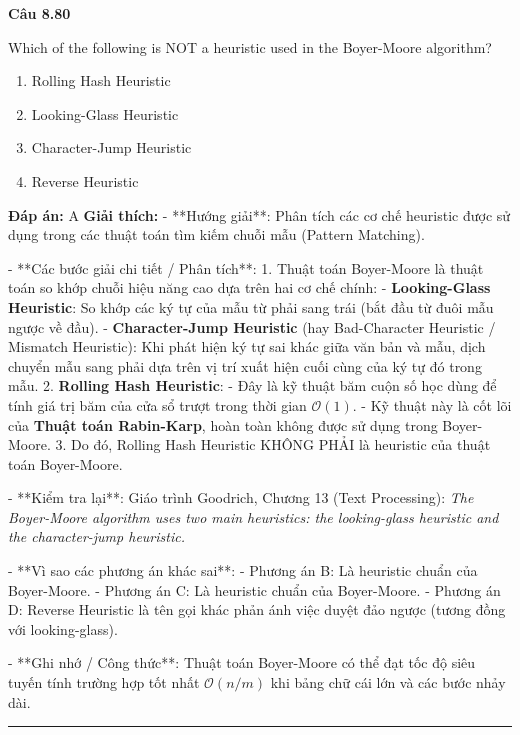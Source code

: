 \documentclass[11pt,a4paper]{article}
\newenvironment{question}[1]{%
  \par\vspace{1em}\noindent\textbf{\large Câu #1}\par\vspace{0.4em}
}{%
  \par\vspace{1em}\hrule\vspace{0.6em}
}
\newenvironment{choices}{%
  \begin{enumerate}[label=\textbf{\Alph*.},leftmargin=2.2em,itemsep=2pt,topsep=3pt]
}{%
  \end{enumerate}
}
\newcommand{\choice}{\item}
\begin{document}
\begin{question}{8.80}
Which of the following is NOT a heuristic used in the Boyer-Moore algorithm?
\begin{choices}
\choice Rolling Hash Heuristic
\choice Looking-Glass Heuristic
\choice Character-Jump Heuristic
\choice Reverse Heuristic
\end{choices}
\textbf{Đáp án:} A
\textbf{Giải thích:} - **Hướng giải**:
Phân tích các cơ chế heuristic được sử dụng trong các thuật toán tìm kiếm chuỗi mẫu (Pattern Matching).


- **Các bước giải chi tiết / Phân tích**:
1. Thuật toán Boyer-Moore là thuật toán so khớp chuỗi hiệu năng cao dựa trên hai cơ chế chính:
   - \textbf{Looking-Glass Heuristic}: So khớp các ký tự của mẫu từ phải sang trái (bắt đầu từ đuôi mẫu ngược về đầu).
   - \textbf{Character-Jump Heuristic} (hay Bad-Character Heuristic / Mismatch Heuristic): Khi phát hiện ký tự sai khác giữa văn bản và mẫu, dịch chuyển mẫu sang phải dựa trên vị trí xuất hiện cuối cùng của ký tự đó trong mẫu.
2. \textbf{Rolling Hash Heuristic}:
   - Đây là kỹ thuật băm cuộn số học dùng để tính giá trị băm của cửa sổ trượt trong thời gian \(\mathcal{O}(1)\).
   - Kỹ thuật này là cốt lõi của \textbf{Thuật toán Rabin-Karp}, hoàn toàn không được sử dụng trong Boyer-Moore.
3. Do đó, Rolling Hash Heuristic KHÔNG PHẢI là heuristic của thuật toán Boyer-Moore.


- **Kiểm tra lại**:
Giáo trình Goodrich, Chương 13 (Text Processing): \textit{The Boyer-Moore algorithm uses two main heuristics: the looking-glass heuristic and the character-jump heuristic.}


- **Vì sao các phương án khác sai**:
- Phương án B: Là heuristic chuẩn của Boyer-Moore.
- Phương án C: Là heuristic chuẩn của Boyer-Moore.
- Phương án D: Reverse Heuristic là tên gọi khác phản ánh việc duyệt đảo ngược (tương đồng với looking-glass).


- **Ghi nhớ / Công thức**:
Thuật toán Boyer-Moore có thể đạt tốc độ siêu tuyến tính trường hợp tốt nhất \(\mathcal{O}(n/m)\) khi bảng chữ cái lớn và các bước nhảy dài.
\end{question}
\end{document}
